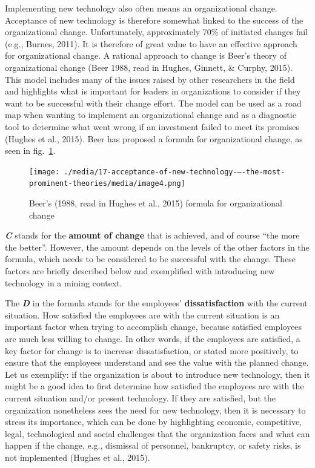 \documentclass[
  12pt,
]{scrbook}
\begin{document}
Implementing new technology also often means an organizational change. Acceptance of new technology is therefore somewhat linked to the success of the organizational change. Unfortunately, approximately 70\% of initiated changes fail (e.g., Burnes, 2011). It is therefore of great value to have an effective approach for organizational change. A rational approach to change is Beer's theory of organizational change (Beer 1988, read in Hughes, Ginnett, \& Curphy, 2015). This model includes many of the issues raised by other researchers in the field and highlights what is important for leaders in organizations to consider if they want to be successful with their change effort. The model can be used as a road map when wanting to implement an organizational change and as a diagnostic tool to determine what went wrong if an investment failed to meet its promises (Hughes et al., 2015). Beer has proposed a formula for organizational change, as seen in fig.~\ref{fig:figure164}.

\begin{figure}
\hypertarget{fig:figure164}{%
\centering
\texttt{[image: ./media/17-acceptance-of-new-technology-–-the-most-prominent-theories/media/image4.png]}
\caption[Beer's (1988, read in Hughes et al., 2015) formula for organizational change]{Beer's (1988, read in Hughes et al., 2015) formula for organizational change\footnotemark{}}\label{fig:figure164}
}
\end{figure}

\textbf{\emph{C}} stands for the \textbf{amount of change} that is achieved, and of course ``the more the better''. However, the amount depends on the levels of the other factors in the formula, which needs to be considered to be successful with the change. These factors are briefly described below and exemplified with introducing new technology in a mining context.

The \textbf{\emph{D}} in the formula stands for the employees' \textbf{dissatisfaction} with the current situation. How satisfied the employees are with the current situation is an important factor when trying to accomplish change, because satisfied employees are much less willing to change. In other words, if the employees are satisfied, a key factor for change is to increase dissatisfaction, or stated more positively, to ensure that the employees understand and see the value with the planned change. Let us exemplify: if the organization is about to introduce new technology, then it might be a good idea to first determine how satisfied the employees are with the current situation and/or present technology. If they are satisfied, but the organization nonetheless sees the need for new technology, then it is necessary to stress its importance, which can be done by highlighting economic, competitive, legal, technological and social challenges that the organization faces and what can happen if the change, e.g., dismissal of personnel, bankruptcy, or safety risks, is not implemented (Hughes et al., 2015).~
\end{document}
